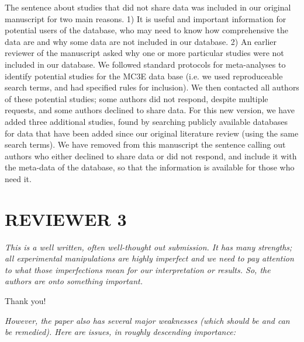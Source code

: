 \documentclass[11pt,a4paper]{letter}
\begin{document}
\par The sentence about studies that did not share data was included in our original manuscript for two main reasons. 1) It is useful and important information for potential users of the database, who may need to know how comprehensive the data are and why some data are not included in our database. 2) An earlier reviewer of the manuscript asked why one or more particular studies were not included in our database. We followed standard protocols for meta-analyses to identify potential studies for the MC3E data base (i.e. we used reproduceable search terms, and had specified rules for inclusion). We then contacted all authors of these potential studies; some authors did not respond, despite multiple requests, and some authors declined to share data.  For this new version, we have added three additional studies, found by searching publicly available databases for data that have been added since our original literature review (using the same search terms). We have removed from this manuscript the sentence calling out authors who either declined to share data or did not respond, and include it with the meta-data of the database, so that the information is available for those who need it.

\section {REVIEWER 3}

\emph{This is a well written, often well-thought out submission. It has many strengths; all experimental manipulations are highly imperfect and we need to pay attention to what those imperfections mean for our interpretation or results. So, the authors are onto something important.}

\par Thank you!

\par \emph{However, the paper also has several major weaknesses (which should be and can be remedied). Here are issues, in roughly descending importance:}
\end{document}

